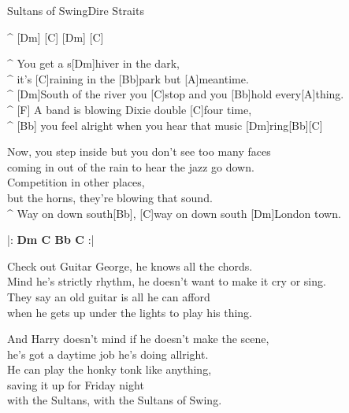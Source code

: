 \begin{song}{Sultans of Swing}{Dire Straits}

\begin{guitar}
^ [Dm] [C] [Dm] [C]\\

\end{guitar}
\begin{guitar}
^ You get a s[Dm]hiver in the dark,\\
^ it's [C]raining in the [Bb]park but [A]meantime.\\
^ [Dm]South of the river you [C]stop and you [Bb]hold every[A]thing.\\
^ [F] A band is blowing Dixie double [C]four time,\\
^ [Bb] you feel alright when you hear that music [Dm]ring[Bb][C]\\
\end{guitar}


\begin{guitar}
Now, you step inside but you don't see too many faces\\
coming in out of the rain to hear the jazz go down.\\
Competition in other places,\\
but the horns, they're blowing that sound.\\
^ Way on down south[Bb], [C]way on down south [Dm]London town.\\
\end{guitar}
|: \textbf{Dm C Bb C} :|


\medskip
{}
\begin{guitar}
Check out Guitar George, he knows all the chords.\\
Mind he's strictly rhythm, he doesn't want to make it cry or sing.\\
They say an old guitar is all he can afford\\
when he gets up under the lights to play his thing.\\
\end{guitar}

\begin{guitar}
And Harry doesn't mind if he doesn't make the scene,\\
he's got a daytime job he's doing allright.\\
He can play the honky tonk like anything,\\
saving it up for Friday night\\
with the Sultans, with the Sultans of Swing.\\
\end{guitar}


\end{song}
